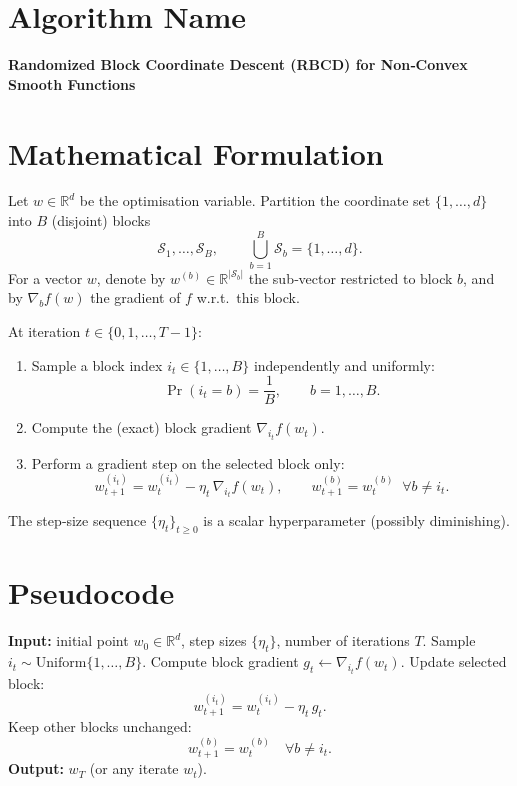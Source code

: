 \documentclass{article}
\begin{document}
\section*{Algorithm Name}
\textbf{Randomized Block Coordinate Descent (RBCD) for Non‑Convex Smooth Functions}

\section*{Mathematical Formulation}
Let $w\in\mathbb{R}^{d}$ be the optimisation variable.  
Partition the coordinate set $\{1,\dots ,d\}$ into $B$ (disjoint) blocks  
\[
\mathcal{S}_{1},\dots ,\mathcal{S}_{B},\qquad 
\bigcup_{b=1}^{B}\mathcal{S}_{b}=\{1,\dots ,d\}.
\]
For a vector $w$, denote by $w^{(b)}\in\mathbb{R}^{|\mathcal{S}_{b}|}$ the sub‑vector restricted to block $b$, and by $\nabla_{b}f(w)$ the gradient of $f$ w.r.t.\ this block.

At iteration $t\in\{0,1,\dots ,T-1\}$:

\begin{enumerate}[label=\arabic*)]
\item Sample a block index $i_{t}\in\{1,\dots ,B\}$ independently and uniformly:
      \[
      \Pr(i_{t}=b)=\frac{1}{B},\qquad b=1,\dots ,B .
      \]
\item Compute the (exact) block gradient $\nabla_{i_{t}}f(w_{t})$.
\item Perform a gradient step on the selected block only:
\[
w_{t+1}^{(i_{t})}=w_{t}^{(i_{t})}-\eta_{t}\,\nabla_{i_{t}}f(w_{t}),\qquad 
w_{t+1}^{(b)}=w_{t}^{(b)}\;\;\forall b\neq i_{t}.
\]
\end{enumerate}
The step‑size sequence $\{\eta_{t}\}_{t\ge 0}$ is a scalar hyperparameter (possibly diminishing).

\section*{Pseudocode}
\begin{algorithm}[H]
\caption{Randomized Block Coordinate Descent (RBCD)}
\begin{algorithmic}[1]
\STATE \textbf{Input:} initial point $w_{0}\in\mathbb{R}^{d}$, step sizes $\{\eta_{t}\}$, number of iterations $T$.
    \STATE Sample $i_{t}\sim \text{Uniform}\{1,\dots ,B\}$.
    \STATE Compute block gradient $g_{t}\gets \nabla_{i_{t}}f(w_{t})$.
    \STATE Update selected block:
    \[
    w_{t+1}^{(i_{t})}=w_{t}^{(i_{t})}-\eta_{t}\,g_{t}.
    \]
    \STATE Keep other blocks unchanged:
    \[
    w_{t+1}^{(b)}=w_{t}^{(b)}\quad\forall b\neq i_{t}.
    \]
\ENDFOR
\STATE \textbf{Output:} $w_{T}$ (or any iterate $w_{t}$).
\end{algorithmic}
\end{algorithm}
\end{document}
